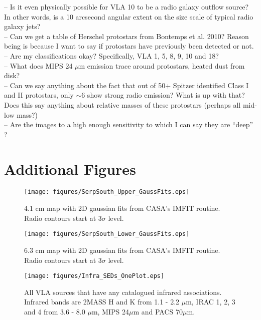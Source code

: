 \documentclass[apj]{emulateapj}
\begin{document}
-- Is it even physically possible for VLA 10 to be a radio galaxy outflow source? In other words, is a 10 arcsecond angular extent on the size scale of typical radio galaxy jets? \\

-- Can we get a table of Herschel protostars from Bontemps et al. 2010? Reason being is because I want to say if protostars have previously been detected or not.\\

-- Are my classifications okay? Specifically, VLA 1, 5, 8, 9, 10 and 18? \\

-- What does MIPS 24 $\mu$m emission trace around protostars, heated dust from disk?\\

-- Can we say anything about the fact that out of 50+ Spitzer identified Class I and II protostars, only $\sim$6 show strong radio emission? What is up with that? Does this say anything about relative masses of these protostars (perhaps all mid-low mass?) \\

-- Are the images to a high enough sensitivity to which I can say they are ``deep'' ? \\

\newpage
\section{Additional Figures}

\begin{figure}[h!]
\label{fig:serpsouth_upper_gaussfits}
\centering
\texttt{[image: figures/SerpSouth\_Upper\_GaussFits.eps]}
\caption{\small{4.1 cm map with 2D gaussian fits from CASA's IMFIT routine. Radio contours start at 3$\sigma$ level.
}}
\end{figure}

\begin{figure}[h!]
\label{fig:serpsouth_lower_gaussfits}
\centering
\texttt{[image: figures/SerpSouth\_Lower\_GaussFits.eps]}
\caption{\small{6.3 cm map with 2D gaussian fits from CASA's IMFIT routine. Radio contours start at 3$\sigma$ level.
}}
\end{figure}

\begin{figure}
\label{fig:infra_SEDs}
\centering
\texttt{[image: figures/Infra\_SEDs\_OnePlot.eps]}
\caption{\small{All VLA sources that have any catalogued infrared associations. Infrared bands are 2MASS H and K from 1.1 - 2.2 $\mu$m, IRAC 1, 2, 3 and 4 from 3.6 - 8.0 $\mu$m, MIPS 24$\mu$m and PACS 70$\mu$m. 
}}
\end{figure}
\end{document}
